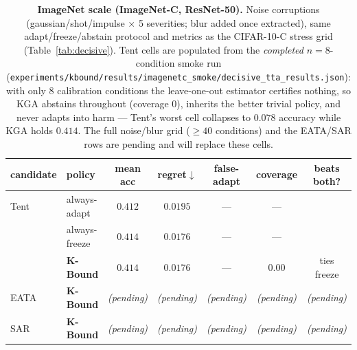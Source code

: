 \documentclass[11pt]{article}
\theoremstyle{plain}
\theoremstyle{definition}
\begin{document}
\begin{table}[h]\centering\small
\begin{tabular}{llccccc}
\toprule
candidate & policy & mean acc & regret$\downarrow$ & false-adapt & coverage & beats both? \\
\midrule
Tent & always-adapt     & $0.412$ & $0.0195$ & --- & --- & \\
     & always-freeze    & $0.414$ & $0.0176$ & --- & --- & \\
     & \textbf{K-Bound} & $\mathbf{0.414}$ & $\mathbf{0.0176}$ & --- & $0.00$ & ties freeze \\
\midrule
EATA & \textbf{K-Bound} & \textit{(pending)} & \textit{(pending)} & \textit{(pending)} & \textit{(pending)} & \textit{(pending)} \\
\midrule
SAR  & \textbf{K-Bound} & \textit{(pending)} & \textit{(pending)} & \textit{(pending)} & \textit{(pending)} & \textit{(pending)} \\
\bottomrule
\end{tabular}
\caption{\textbf{ImageNet scale (ImageNet-C, ResNet-50).} Noise corruptions
(gaussian/shot/impulse $\times$ 5 severities; blur added once extracted), same
adapt/freeze/abstain protocol and metrics as the CIFAR-10-C stress grid
(Table~\ref{tab:decisive}). Tent cells are populated from the \emph{completed}
$n{=}8$-condition smoke run
(\texttt{experiments/kbound/results/imagenetc\_smoke/decisive\_tta\_results.json}): with only $8$
calibration conditions the leave-one-out estimator certifies nothing, so \textsc{KGA}
abstains throughout (coverage $0$), inherits the better trivial policy, and never adapts
into harm --- Tent's worst cell collapses to $0.078$ accuracy while \textsc{KGA} holds
$0.414$. The full noise/blur grid ($\ge\!40$ conditions) and the EATA/SAR rows are
pending and will replace these cells.}
\label{tab:imagenetc}
\end{table}
\end{document}
